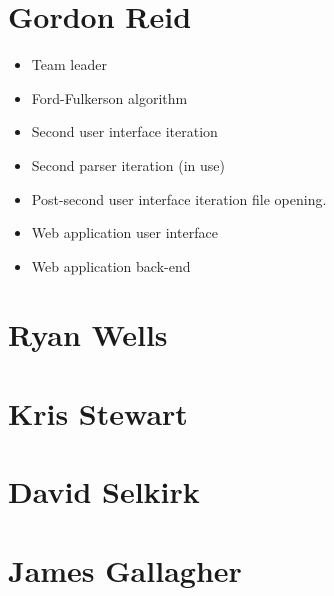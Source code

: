 \section{Gordon Reid}

\begin{itemize}
\item Team leader
\item Ford-Fulkerson algorithm
\item Second user interface iteration
\item Second parser iteration (in use)
\item Post-second user interface iteration file opening.
\item Web application user interface
\item Web application back-end
\end{itemize}

\section{Ryan Wells}

\section{Kris Stewart}

\section{David Selkirk}

\section{James Gallagher}